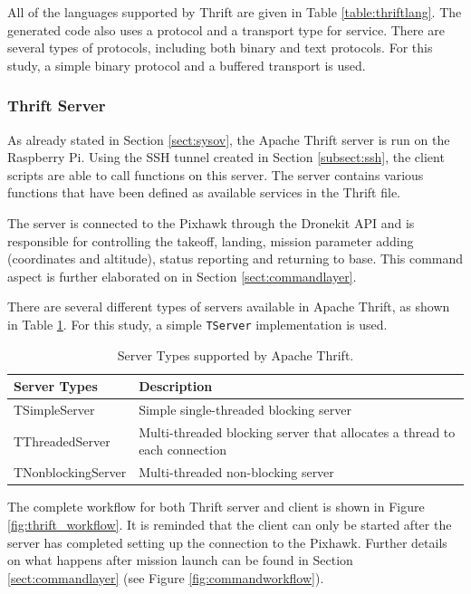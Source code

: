 All of the languages supported by Thrift are given in Table \ref{table:thriftlang}. The generated code also uses a protocol and a transport type for service. There are several types of protocols, including both binary and text protocols. For this study, a simple binary protocol and a buffered transport is used.

\subsubsection{Thrift Server}
As already stated in Section \ref{sect:sysov}, the Apache Thrift server is run on the Raspberry Pi. Using the SSH tunnel created in Section \ref{subsect:ssh}, the client scripts are able to call functions on this server. The server contains various functions that have been defined as available services in the Thrift file.

The server is connected to the Pixhawk through the Dronekit API and is responsible for controlling the takeoff, landing, mission parameter adding (coordinates and altitude), status reporting and returning to base. This command aspect is further elaborated on in Section \ref{sect:commandlayer}.

There are several different types of servers available in Apache Thrift, as shown in Table \ref{table:thriftservertypes}. For this study, a simple \texttt{TServer} implementation is used.

\begin{table}[t]
 \caption{Server Types supported by Apache Thrift.}
 \linespread{0.7}\selectfont
 \begin{center}
     \begin{tabular}{|m{5cm}|m{8cm}|} 
     \hline
     \textbf{Server Types} & \textbf{Description}\\ 
     \hline
     TSimpleServer & Simple single-threaded blocking server\\
     \hline
     TThreadedServer & Multi-threaded blocking server that allocates a thread to each connection\\
     \hline
     TNonblockingServer & Multi-threaded non-blocking server\\
     \hline
 \end{tabular}
 \end{center}{}
 \label{table:thriftservertypes}
\end{table}
\FloatBarrier

The complete workflow for both Thrift server and client is shown in Figure \ref{fig:thrift_workflow}. It is reminded that the client can only be started after the server has completed setting up the connection to the Pixhawk. Further details on what happens after mission launch can be found in Section \ref{sect:commandlayer} (see Figure \ref{fig:commandworkflow}).

